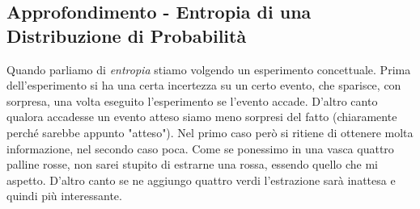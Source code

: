 \subsection{Approfondimento - Entropia di una Distribuzione di Probabilità}
Quando parliamo di \textit{entropia} stiamo volgendo un esperimento
concettuale. Prima dell'esperimento si ha una certa incertezza su un certo
evento, che sparisce, con sorpresa, una volta eseguito l'esperimento se l'evento
accade. D'altro canto qualora accadesse un evento atteso siamo meno sorpresi del
fatto (chiaramente perché sarebbe appunto "atteso"). Nel primo caso però si ritiene di ottenere molta informazione, nel
secondo caso poca. Come se ponessimo in una vasca quattro palline rosse, non
sarei stupito di estrarne una rossa, essendo quello che mi aspetto. D'altro
canto se ne aggiungo quattro verdi l'estrazione sarà inattesa e quindi più
interessante.\\ 
